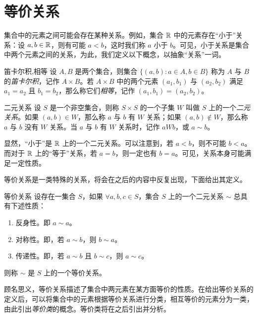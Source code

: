 
\section{等价关系}

集合中的元素之间可能会存在某种关系。例如，集合 $\mathbb R$ 中的元素存在“小于”关系：设 $a, b \in \mathbb R$，则有可能 $a < b$，这时我们称 $a$ 小于 $b$。可见，小于关系是集合中两个元素之间的关系，为此，我们定义以下概念，以抽象“关系”一词。

\begin{definition}{笛卡尔积,相等}
	设 $A, B$ 是两个集合，则集合 $\{ (a, b): a \in A, b \in B \}$ 称为 $A$ 与 $B$ 的\emph{笛卡尔积}，记作 $A \times B$。若 $A \times B$ 中的两个元素 $(a_1, b_1)$ 与 $(a_2, b_2)$ 满足 $a_1 = a_2$ 且 $b_1 = b_2$，那么称它们\emph{相等}，记作 $(a_1, b_1) = (a_2, b_2)$。
\end{definition}

\begin{definition}{二元关系}
	设 $S$ 是一个非空集合，则称 $S \times S$ 的一个子集 $W$ 叫做 $S$ 上的一个\emph{二元关系}。如果 $(a, b) \in W$，那么称 $a$ 与 $b$ 有 $W$ 关系；如果 $(a, b) \not \in W$，那么称 $a$ 与 $b$ 没有 $W$ 关系。当 $a$ 与 $b$ 有 $W$ 关系时，记作 $aWb$，或 $a \sim b$。
\end{definition}

显然，“小于”是 $\mathbb R$ 上的一个二元关系。可以注意到，若 $a < b$，则不可能 $b < a$。而对于 $\mathbb R$ 上的“等于”关系，若 $a = b$，则一定也有 $b = a$。可见，关系本身可能满足一定性质。

等价关系是一类特殊的关系，将会在之后的内容中反复出现，下面给出其定义。

\begin{definition}{等价关系}
	设存在一集合 $S$，如果 $\forall a, b, c \in S$，集合 $S$ 上的一个二元关系 $\sim$ 总具有下述性质：
	\begin{enumerate}
		\item 反身性。即 $a \sim a$。
		\item 对称性。即，若 $a \sim b$，则 $b \sim a$。
		\item 传递性。即，若 $a \sim b$ 且 $b \sim c$，则 $a \sim c$。
	\end{enumerate}

	则称 $\sim$ 是 $S$ 上的一个等价关系。
\end{definition}

顾名思义，等价关系描述了集合中两元素在某方面等价的性质。在给出等价关系的定义后，可以将集合中的元素根据等价关系进行分类，相互等价的元素分为一类，由此引出\emph{等价类}的概念。等价类将在之后引出并分析。

